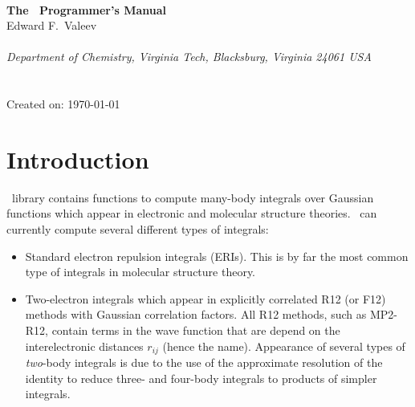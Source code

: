 \documentclass[12pt]{article}
\begin{document}


\begin{center}
\ \\
\vspace{2.0in}
{\bf {\Large The \LIBINT\ Programmer's Manual}} \\
\vspace{0.5in}
Edward F.\ Valeev \\
\ \\
{\em Department of Chemistry, Virginia Tech, Blacksburg, Virginia 24061 USA}\\
\ \\
\vspace{0.3in}
\LIBINTv \\
Created on: \today
\end{center}

\thispagestyle{empty}

\newpage
\section{Introduction}
\LIBINT\ library contains functions to compute many-body integrals over Gaussian
functions which appear in electronic and molecular structure theories.
\LIBINTv \cite{Libint1}\ can currently compute several different types of integrals:

\begin{itemize}

\item Standard electron repulsion integrals (ERIs). This is by far the most common type of
integrals in molecular structure theory.

\item Two-electron integrals which appear in explicitly correlated R12 (or F12) methods
with Gaussian correlation factors.\cite{Kutzelnigg85,Kutzelnigg91,Persson96} All R12 methods, such as
MP2-R12, contain terms in the wave function that are depend on the interelectronic distances
$r_{ij}$ (hence the name). Appearance of several types of {\em two}-body integrals
is due to the use of the approximate resolution of the identity to reduce three- and four-body
integrals to products of simpler integrals.

\end{itemize}
\end{document}
